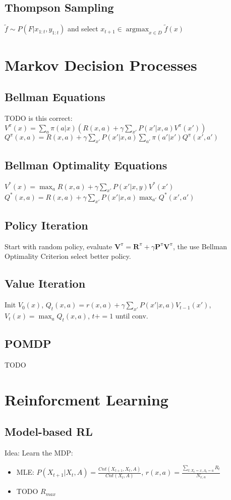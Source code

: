 \documentclass[11pt]{article}
\newcommand{\argmax}{\operatorname{argmax}}
\begin{document}
\begin{multicols*}{3}
\subsection*{Thompson Sampling}
$\tilde{f} \sim P(F|x_{1:t}, y_{1:t})$ and select $x_{t+1} \in \argmax_{x\in D} \tilde{f}(x)$
\section*{Markov Decision Processes}

\subsection*{Bellman Equations} TODO is this correct:
$V^\pi(x) = \sum_a \pi(a|x) (R(x,a) + \gamma \sum_{x'} P(x'|x,a) V^\pi (x'))$\\
$Q^\pi(x,a) = R(x,a) + \gamma \sum_{x'} P(x'|x,a) \sum_{a'} \pi(a'|x')Q^\pi(x',a')$
\subsection*{Bellman Optimality Equations}
$V^*(x) = \max_a R(x,a) + \gamma \sum_{x'} P(x' | x,y) V^*(x')$\\
$Q^*(x,a) = R(x,a) + \gamma \sum_{x'}P(x'|x,a) \max_{a'} Q^*(x',a')$
\subsection*{Policy Iteration}
Start with random policy, evaluate $\mathbf{V}^\pi = \mathbf{R}^\pi + \gamma \mathbf{P}^\pi \mathbf{V}^\pi$, the use Bellman Optimality Criterion select better policy.
\subsection*{Value Iteration}
Init $V_0(x)$, $Q_t(x,a) = r(x,a) + \gamma \sum_{x'} P(x'|x,a)V_{t-1}(x')$, $V_t(x) = \max_a Q_t (x,a)$, $t+=1$ until conv.
\subsection*{POMDP}
TODO

\section*{Reinforcment Learning}
\subsection*{Model-based RL}
Idea: Learn the MDP:
\begin{itemize}
	\item MLE: $P(X_{t+1}|X_t,A) = \frac{Cnt(X_{t+1},X_t,A)}{Cnt(X_t,A)}$, $r(x,a)=\frac{\sum_{t:X_t=x,A_t=a} R_t }{N_{x,a}}$
	\item TODO $R_{max}$
\end{itemize}


\end{multicols*}
\end{document}
